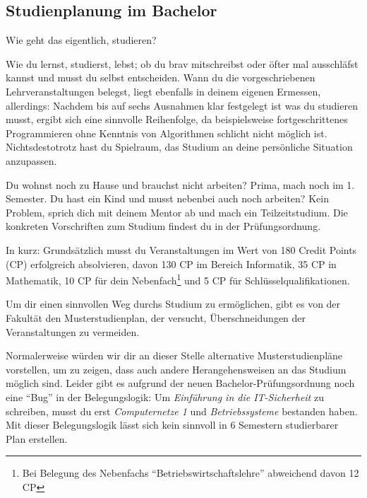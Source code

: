 

\subsection{Studienplanung im Bachelor}

Wie geht das eigentlich, studieren?

Wie du lernst, studierst, lebst; ob du brav mitschreibst oder öfter mal ausschläfst kannst und musst du selbst entscheiden. Wann du die vorgeschriebenen Lehrveranstaltungen belegst, liegt ebenfalls in deinem eigenen Ermessen, allerdings: Nachdem bis auf sechs Ausnahmen klar festgelegt ist was du studieren musst, ergibt sich eine sinnvolle Reihenfolge, da beispielsweise fortgeschrittenes Programmieren ohne Kenntnis von Algorithmen schlicht nicht möglich ist. Nichtsdestotrotz hast du Spielraum, das Studium an deine persönliche Situation anzupassen.


Du wohnst noch zu Hause und brauchst nicht arbeiten? Prima, mach noch \iftoggle{winter}{Theoretische Informatik 1}{Technische Informatik oder Computernetze} im 1. Semester. Du hast ein Kind und musst nebenbei auch noch arbeiten? Kein Problem, sprich dich mit deinem Mentor ab und mach ein Teilzeitstudium. Die konkreten Vorschriften zum Studium findest du in der Prüfungsordnung.


In kurz: Grundsätzlich musst du Veranstaltungen im Wert von 180 Credit Points (CP) erfolgreich absolvieren, davon 130 CP im Bereich Informatik, 35 CP in Mathematik, 10 CP für dein Nebenfach\footnote{Bei Belegung des Nebenfachs \enquote{Betriebswirtschaftslehre} abweichend davon 12 CP} und 5 CP für Schlüsselqualifikationen. 


Um dir einen sinnvollen Weg durchs Studium zu ermöglichen, gibt es von der Fakultät den Musterstudienplan, der versucht, Überschneidungen der Veranstaltungen zu vermeiden. %


Normalerweise würden wir dir an dieser Stelle alternative Musterstudienpläne vorstellen, um zu zeigen, dass auch andere Herangehensweisen an das Studium möglich sind. Leider gibt es aufgrund der neuen Bachelor-Prüfungsordnung noch eine \enquote{Bug} in der Belegungslogik: Um \emph{Einführung in die IT-Sicherheit} zu schreiben, musst du erst \emph{Computernetze 1} und \emph{Betriebssysteme} bestanden haben. Mit dieser Belegungslogik lässt sich kein sinnvoll in 6 Semestern studierbarer Plan erstellen.


